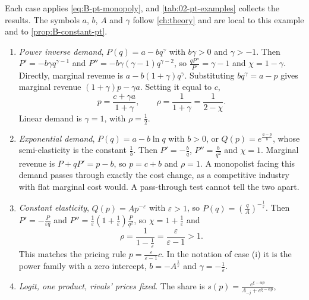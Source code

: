 \begin{example}\label{ex:B-passthrough}
Each case applies \eqref{eq:B-pt-monopoly}, and \cref{tab:02-pt-examples} collects the results. The symbols
$a$, $b$, $A$ and $\gamma$ follow \cref{ch:theory} and are local to this example and to \cref{prop:B-constant-pt}.
\begin{enumerate}[label=(\roman*)]
  \item \emph{Power inverse demand}, $P(q) = a - bq^{\gamma}$ with $b\gamma > 0$ and $\gamma > -1$. Then
  $P' = -b\gamma q^{\gamma - 1}$ and $P'' = -b\gamma(\gamma - 1)q^{\gamma - 2}$, so $\frac{qP''}{P'} = \gamma - 1$ and
  $\chi = 1 - \gamma$. Directly, marginal revenue is $a - b(1 + \gamma)q^{\gamma}$. Substituting $bq^{\gamma} = a - p$
  gives marginal revenue $(1 + \gamma)p - \gamma a$. Setting it equal to $c$,
  \begin{equation*}
  p = \frac{c + \gamma a}{1 + \gamma} , \qquad \rho = \frac{1}{1 + \gamma} = \frac{1}{2 - \chi} .
  \end{equation*}
  Linear demand is $\gamma = 1$, with $\rho = \frac{1}{2}$.
  \item \emph{Exponential demand}, $P(q) = a - b\ln q$ with $b > 0$, or $Q(p) = e^{\frac{a - p}{b}}$, whose
  semi-elasticity is the constant $\frac{1}{b}$. Then $P' = -\frac{b}{q}$, $P'' = \frac{b}{q^2}$ and $\chi = 1$. Marginal
  revenue is $P + qP' = p - b$, so $p = c + b$ and $\rho = 1$. A monopolist facing this demand passes through
  exactly the cost change, as a competitive industry with flat marginal cost would. A pass-through test cannot tell
  the two apart.
  \item \emph{Constant elasticity}, $Q(p) = Ap^{-\varepsilon}$ with $\varepsilon > 1$, so $P(q) = (\frac{q}{A})^{-\frac{1}{\varepsilon}}$.
  Then $P' = -\frac{P}{\varepsilon q}$ and $P'' = \frac{1}{\varepsilon}(1 + \frac{1}{\varepsilon})\frac{P}{q^2}$, so
  $\chi = 1 + \frac{1}{\varepsilon}$ and
  \begin{equation*}
  \rho = \frac{1}{1 - \frac{1}{\varepsilon}} = \frac{\varepsilon}{\varepsilon - 1} > 1 .
  \end{equation*}
  This matches the pricing rule $p = \frac{\varepsilon}{\varepsilon - 1}c$. In the notation of case (i) it is the power
  family with a zero intercept, $b = -A^{\frac{1}{\varepsilon}}$ and $\gamma = -\frac{1}{\varepsilon}$.
  \item \emph{Logit, one product, rivals' prices fixed}. The share is $s(p) = \frac{e^{\xi - \alpha p}}{\Lambda_{-j} + e^{\xi - \alpha p}}$,

\end{enumerate}
\end{example}
